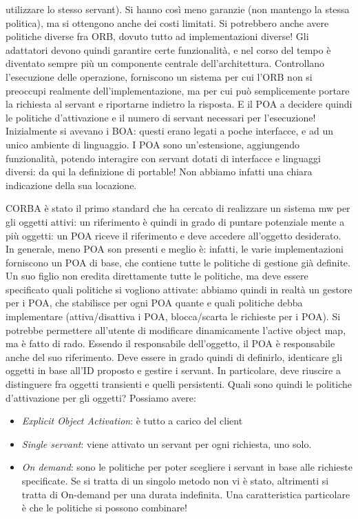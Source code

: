 utilizzare lo stesso servant). Si hanno così meno garanzie (non mantengo la stessa politica), ma si ottengono anche dei 
costi limitati. Si potrebbero anche avere politiche diverse fra ORB, dovuto tutto ad implementazioni diverse!
Gli adattatori devono quindi garantire certe funzionalità, e nel corso del tempo è diventato sempre più un componente 
centrale dell'architettura. Controllano l'esecuzione delle operazione, forniscono un sistema per cui l'ORB non
si preoccupi realmente dell'implementazione, ma per cui può semplicemente portare la richiesta al servant e riportarne 
indietro la risposta. E il POA a decidere quindi le politiche d'attivazione e il numero di servant necessari per
l'esecuzione!
Inizialmente si avevano i BOA: questi erano legati a poche interfacce, e ad un unico ambiente di linguaggio. I POA sono 
un'estensione, aggiungendo funzionalità, potendo interagire con servant dotati di interfacce e linguaggi diversi: da
qui la definizione di portable! Non abbiamo infatti una chiara indicazione della sua locazione.

CORBA è stato il primo standard che ha cercato di realizzare un sistema mw per gli oggetti attivi: un riferimento è 
quindi in grado di puntare potenziale mente a più oggetti: un POA riceve il riferimento e deve accedere all'oggetto
desiderato. In generale, meno POA son presenti e meglio è: infatti, le varie implementazioni forniscono un POA di base, 
che contiene tutte le politiche di gestione già definite. Un suo figlio non eredita direttamente tutte le politiche, ma
deve essere specificato quali politiche si vogliono attivate: abbiamo quindi in realtà un gestore per i POA, che
stabilisce per ogni POA quante e quali politiche debba implementare (attiva/disattiva i POA, blocca/scarta le richieste 
per i POA). Si potrebbe permettere all'utente di modificare dinamicamente l'active object map, ma è fatto di rado.
Essendo il responsabile dell'oggetto, il POA è responsabile anche del suo riferimento. Deve essere in grado quindi di 
definirlo, identicare gli oggetti in base all'ID proposto e gestire i servant. In particolare, deve riuscire a 
distinguere fra oggetti transienti e quelli persistenti.
Quali sono quindi le politiche d'attivazione per gli oggetti? Possiamo avere:
\begin{itemize}
 \item \textit{Explicit Object Activation}: è tutto a carico del client
 \item \textit{Single servant}: viene attivato un servant per ogni richiesta, uno solo.
 \item \textit{On demand}: sono le politiche per poter scegliere i servant in base alle richieste specificate. Se si 
 tratta  di un singolo metodo non vi è stato, altrimenti si tratta di On-demand per una durata indefinita. Una 
 caratteristica particolare è che le politiche si possono combinare!
\end{itemize}

